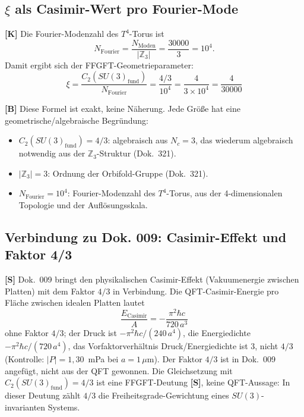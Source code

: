 \subsection{$\xi$ als Casimir-Wert pro Fourier-Mode}

\textbf{[K]} Die Fourier-Modenzahl des $T^4$-Torus ist
\begin{equation}
  N_{\text{Fourier}} = \frac{N_{\text{Moden}}}{|\mathbb{Z}_3|}
  = \frac{30000}{3} = 10^4.
  \label{eq:NFourier}
\end{equation}
Damit ergibt sich der FFGFT-Geometrieparameter:
\begin{equation}
  \boxed{\xi = \frac{C_2(SU(3)_{\text{fund}})}{N_{\text{Fourier}}}
  = \frac{4/3}{10^4}
  = \frac{4}{3 \times 10^4}
  = \frac{4}{30000}}
  \label{eq:xi_casimir}
\end{equation}

\textbf{[B]} Diese Formel ist exakt, keine Näherung.
Jede Größe hat eine geometrische/algebraische Begründung:
\begin{itemize}
  \item $C_2(SU(3)_{\text{fund}}) = 4/3$: algebraisch aus $N_c = 3$,
    das wiederum algebraisch notwendig aus der $\mathbb{Z}_3$-Struktur
    (Dok.~321).
  \item $|\mathbb{Z}_3| = 3$: Ordnung der Orbifold-Gruppe (Dok.~321).
  \item $N_{\text{Fourier}} = 10^4$: Fourier-Modenzahl des $T^4$-Torus,
    aus der 4-dimensionalen Topologie und der Auflösungsskala.
\end{itemize}

\subsection{Verbindung zu Dok. 009: Casimir-Effekt und Faktor 4/3}

\textbf{[S]} Dok.~009 bringt den physikalischen Casimir-Effekt
(Vakuumenergie zwischen Platten) mit dem Faktor $4/3$ in Verbindung.
Die QFT-Casimir-Energie pro Fläche zwischen idealen Platten lautet
\begin{equation}
  \frac{E_{\text{Casimir}}}{A} = -\frac{\pi^2\hbar c}{720\,a^3}
  \label{eq:casimir_eff}
\end{equation}
ohne Faktor $4/3$; der Druck ist $-\pi^2\hbar c/(240\,a^4)$, die
Energiedichte $-\pi^2\hbar c/(720\,a^4)$, das Vorfaktorverhältnis
Druck/Energiedichte ist $3$, nicht $4/3$ (Kontrolle: $|P| = 1{,}30$~mPa
bei $a = 1\,\mu$m). Der Faktor $4/3$ ist in Dok.~009 angefügt, nicht aus
der QFT gewonnen. Die Gleichsetzung mit $C_2(SU(3)_{\text{fund}}) = 4/3$
ist eine FFGFT-Deutung \textbf{[S]}, keine QFT-Aussage: In dieser Deutung
zählt $4/3$ die Freiheitsgrade-Gewichtung eines $SU(3)$-invarianten Systems.

